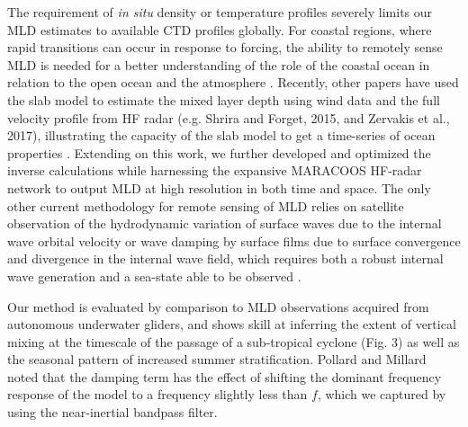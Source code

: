 \documentclass{article}
\begin{document}
The requirement of \textit{in situ} density or temperature profiles severely limits our MLD estimates to available CTD profiles globally. 
For coastal regions, where rapid transitions can occur in response to forcing, the ability to remotely sense MLD is needed for a better understanding of the role of the coastal ocean in relation to the open ocean and the atmosphere \cite{Miles2013,Zhang2018}.
Recently, other papers have used the slab model to estimate the mixed layer depth using wind data and the full velocity profile from HF radar (e.g. Shrira and Forget, 2015, and Zervakis et al., 2017), illustrating the capacity of the slab model to get a time-series of ocean properties \cite{Shrira2015, Zervakis2017}.
Extending on this work, we further developed and optimized the inverse calculations while harnessing the expansive MARACOOS HF-radar network to output MLD at high resolution in both time and space. 
The only other current methodology for remote sensing of MLD relies on satellite observation of the hydrodynamic variation of surface waves due to the internal wave orbital velocity or wave damping by surface
films due to surface convergence and divergence in the internal wave field, which requires both a robust internal wave generation and a sea-state able to be observed \cite{Li2000}.


Our method is evaluated by comparison to MLD observations acquired from autonomous underwater gliders, and shows skill at inferring the extent of vertical mixing at the timescale of the passage of a sub-tropical cyclone (Fig. 3) as well as the seasonal pattern of increased summer stratification. 
Pollard and Millard \cite{Pollard1970a} noted that the damping term has the effect of shifting the dominant frequency response of the model to a frequency slightly less than $f$, which we captured by using the near-inertial bandpass filter.
\end{document}
